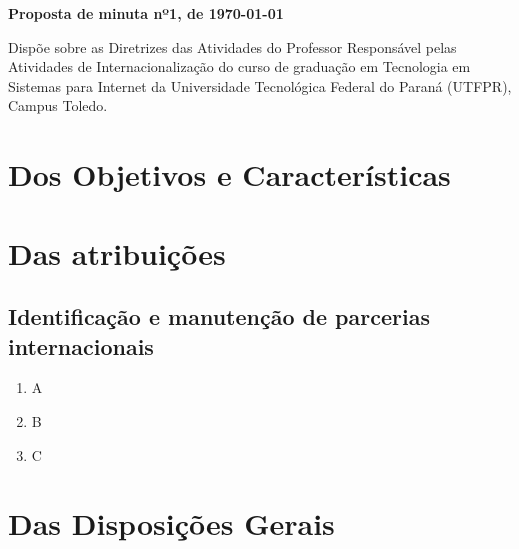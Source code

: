 \documentclass{styleUtfpr}
\begin{document}
	


\begin{center}
	\small \textbf{Proposta de minuta nº1, de \today}
\end{center}

\begin{flushright}
	\begin{minipage}{0.5\textwidth}
		Dispõe sobre as Diretrizes das Atividades do Professor Responsável pelas Atividades de Internacionalização do curso de graduação em Tecnologia em Sistemas para Internet da Universidade Tecnológica Federal do Paraná (UTFPR), Campus Toledo.
	\end{minipage}
\end{flushright}


\chapter{Dos Objetivos e Características}
\begin{myarticles}
	\item \lipsum[1]

\end{myarticles}	
	
\chapter{Das atribuições}
\begin{myarticles}[resume]
	\item \lipsum[1]
\end{myarticles}	

\section{Identificação e manutenção de parcerias internacionais}

\begin{myarticles}[resume]
	\item \lipsum[1]
	\begin{enumerate}[label=\Roman*.]
		\item A
		\item B
		\item C
	\end{enumerate}
\end{myarticles}


\chapter{Das Disposições Gerais}
\begin{myarticles}[resume]
	\item \lipsum[1]
	\item \lipsum[1]
\end{myarticles}
\end{document}

